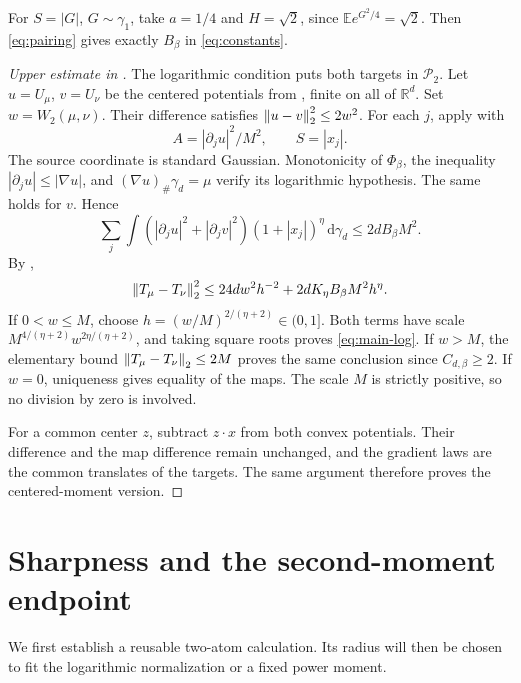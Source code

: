 \documentclass[11pt]{article}
\numberwithin{equation}{section}
\theoremstyle{remark}\newtheorem{remark}[theorem]{Remark}
\newcommand{\R}{\mathbb R}\newcommand{\E}{\mathbb E}
\newcommand{\Prob}{\mathcal P}\newcommand{\dd}{\,\mathrm d}
\begin{document}
For $S=|G|$, $G\sim\gamma_1$, take $a=1/4$ and $H=\sqrt2$, since $\E e^{G^2/4}=\sqrt2$. Then \eqref{eq:pairing} gives exactly $B_\beta$ in \eqref{eq:constants}.

\begin{proof}[Upper estimate in ]
The logarithmic condition puts both targets in $\Prob_2$. Let $u=U_\mu$, $v=U_\nu$ be the centered potentials from , finite on all of $\R^d$. Set $w=W_2(\mu,\nu)$. Their difference satisfies $\left\lVert u-v\right\rVert_2^2\le2w^2$.
For each $j$, apply  with
\[
 A=|\partial_j u|^2/M^2,\qquad S=|x_j|.
\]
The source coordinate is standard Gaussian. Monotonicity of $\Phi_\beta$, the inequality $|\partial_j u|\le|\nabla u|$, and $(\nabla u)_\#\gamma_d=\mu$ verify its logarithmic hypothesis. The same holds for $v$. Hence
\[
 \sum_j\int(|\partial_j u|^2+|\partial_j v|^2)
               (1+|x_j|)^\eta\dd\gamma_d\le2dB_\beta M^2.
\]
By ,
\begin{equation}\label{eq:log-balance}
 \left\lVert T_\mu-T_\nu\right\rVert_2^2
 \le24d w^2h^{-2}+2dK_\eta B_\beta M^2h^\eta.
\end{equation}
If $0<w\le M$, choose $h=(w/M)^{2/(\eta+2)}\in(0,1]$. Both terms have scale $M^{4/(\eta+2)}w^{2\eta/(\eta+2)}$, and taking square roots proves \eqref{eq:main-log}. If $w>M$, the elementary bound $\left\lVert T_\mu-T_\nu\right\rVert_2\le2M$ proves the same conclusion since $C_{d,\beta}\ge2$. If $w=0$, uniqueness gives equality of the maps. The scale $M$ is strictly positive, so no division by zero is involved.

For a common center $z$, subtract $z\cdot x$ from both convex potentials. Their difference and the map difference remain unchanged, and the gradient laws are the common translates of the targets. The same argument therefore proves the centered-moment version.
\end{proof}

\section{Sharpness and the second-moment endpoint}\label{sec:sharpness}
We first establish a reusable two-atom calculation. Its radius will then be chosen to fit the logarithmic normalization or a fixed power moment.
\end{document}
